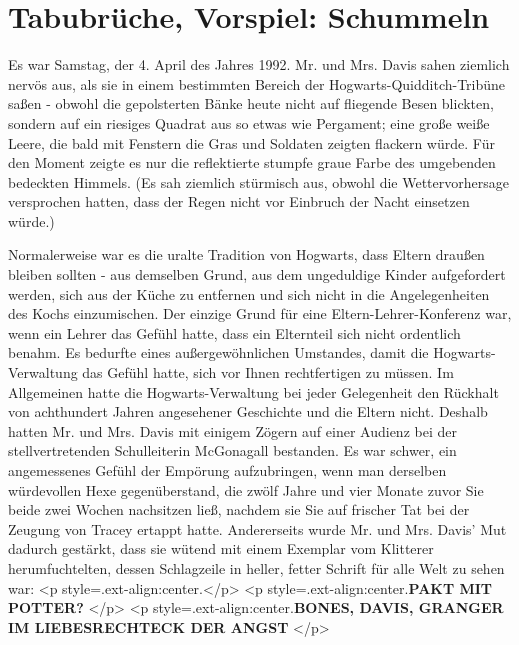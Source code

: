 \chapter{Tabubrüche, Vorspiel: Schummeln}

Es war Samstag, der 4. April des Jahres 1992. Mr. und Mrs. Davis sahen ziemlich
nervös aus, als sie in einem bestimmten Bereich der Hogwarts-Quidditch-Tribüne
saßen - obwohl die gepolsterten Bänke heute nicht auf fliegende Besen blickten,
sondern auf ein riesiges Quadrat aus so etwas wie Pergament; eine große weiße
Leere, die bald mit Fenstern die Gras und Soldaten zeigten flackern würde. Für
den Moment zeigte es nur die reflektierte stumpfe graue Farbe des umgebenden
bedeckten Himmels. (Es sah ziemlich stürmisch aus, obwohl die Wettervorhersage
versprochen hatten, dass der Regen nicht vor Einbruch der Nacht einsetzen
würde.)

Normalerweise war es die uralte Tradition von Hogwarts, dass Eltern draußen
bleiben sollten - aus demselben Grund, aus dem ungeduldige Kinder aufgefordert
werden, sich aus der Küche zu entfernen und sich nicht in die Angelegenheiten
des Kochs einzumischen. Der einzige Grund für eine Eltern-Lehrer-Konferenz war,
wenn ein Lehrer das Gefühl hatte, dass ein Elternteil sich nicht ordentlich
benahm. Es bedurfte eines außergewöhnlichen Umstandes, damit die
Hogwarts-Verwaltung das Gefühl hatte, sich vor Ihnen rechtfertigen zu müssen. Im
Allgemeinen hatte die Hogwarts-Verwaltung bei jeder Gelegenheit den Rückhalt von
achthundert Jahren angesehener Geschichte und die Eltern nicht. Deshalb hatten
Mr. und Mrs. Davis mit einigem Zögern auf einer Audienz bei der
stellvertretenden Schulleiterin McGonagall bestanden. Es war schwer, ein
angemessenes Gefühl der Empörung aufzubringen, wenn man derselben würdevollen
Hexe gegenüberstand, die zwölf Jahre und vier Monate zuvor Sie beide zwei Wochen
nachsitzen ließ, nachdem sie Sie auf frischer Tat bei der Zeugung von Tracey
ertappt hatte. Andererseits wurde Mr. und Mrs. Davis' Mut dadurch gestärkt, dass
sie wütend mit einem Exemplar vom Klitterer herumfuchtelten, dessen Schlagzeile
in heller, fetter Schrift für alle Welt zu sehen war: <p
style=\grqq{}.ext-align:center\grqq{}.</p> <p
style=\grqq{}.ext-align:center\grqq{}.\textbf{PAKT MIT POTTER?} </p> <p
style=\grqq{}.ext-align:center\grqq{}.\textbf{BONES, DAVIS, GRANGER IM
LIEBESRECHTECK DER ANGST} </p>

